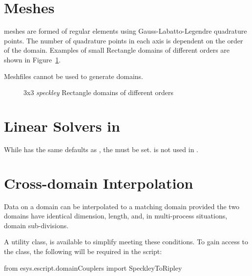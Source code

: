 \section{Meshes}
\label{SPECKLEY MESHES}

\speckley meshes are formed of regular elements using Gauss-Labatto-Legendre
quadrature points. The number of quadrature points in each axis is dependent
on the order of the domain. Examples of small Rectangle domains of different 
orders are shown in Figure~\ref{SPECKLEY:FIG:MESHES}.

Meshfiles cannot be used to generate \speckley domains.

\begin{figure}
    \begin{center}
    \end{center}
    \caption{3x3 \emph{speckley} Rectangle domains of different orders}
    \label{SPECKLEY:FIG:MESHES}
\end{figure}

\section{Linear Solvers in \SolverOptions}
While \speckley has the same defaults as \ripley, the \HRZLUMPING must be set.
\PASO is not used in \speckley.

\section{Cross-domain Interpolation}
Data on a \speckley domain can be interpolated to a matching \ripley domain
provided the two domains have identical dimension, length, and, in multi-process
situations, domain sub-divisions.

A utility class,  is available to simplify meeting these
conditions. To gain access to the class, the following will be required in
the script:

\begin{python}
 from esys.escript.domainCouplers import SpeckleyToRipley
\end{python}

